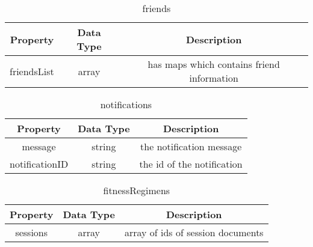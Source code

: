 \documentclass[12pt, letterpaper]{article}
\begin{document}
    \begin{table}[ht]
      \centering
      \caption{friends}
      \begin{tabular}{||c c c||} 
        \hline
        Property & Data Type & Description\\ [0.1ex] 
        \hline\hline
        friendsList & array & has maps which contains friend information\\
        \hline
      \end{tabular}
      \label{table:data}
    \end{table}
    
    \begin{table}[ht]
      \centering
      \caption{notifications}
      \begin{tabular}{||c c c||} 
        \hline
        Property & Data Type & Description\\ [0.1ex] 
        \hline\hline
        message & string & the notification message\\
        notificationID & string & the id of the notification\\
        \hline
      \end{tabular}
      \label{table:data}
    \end{table}
    
    \begin{table}[ht]
      \centering
      \caption{fitnessRegimens}
      \begin{tabular}{||c c c||} 
        \hline
        Property & Data Type & Description\\ [0.1ex] 
        \hline\hline
        sessions & array & array of ids of session documents\\
        \hline
      \end{tabular}
      \label{table:data}
    \end{table}
    
\end{document}
